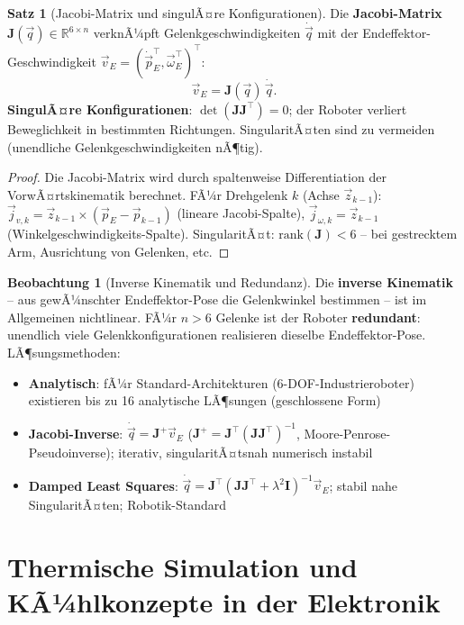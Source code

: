 ﻿\documentclass[a4paper,12pt]{report}
\theoremstyle{definition}
\newtheorem{satz}{Satz}
\newtheorem{beobachtung}{Beobachtung}
\begin{document}
\begin{satz}[Jacobi-Matrix und singulÃ¤re Konfigurationen]
Die \textbf{Jacobi-Matrix} $\mathbf{J}(\vec{q}) \in \mathbb{R}^{6\times n}$
verknÃ¼pft Gelenkgeschwindigkeiten $\dot{\vec{q}}$ mit der
Endeffektor-Geschwindigkeit $\vec{v}_E = (\dot{\vec{p}}_E^\top, \vec{\omega}_E^\top)^\top$:
\[
  \vec{v}_E = \mathbf{J}(\vec{q})\,\dot{\vec{q}}.
\]
\textbf{SingulÃ¤re Konfigurationen}: $\det(\mathbf{J}\mathbf{J}^\top) = 0$;
der Roboter verliert Beweglichkeit in bestimmten Richtungen.
SingularitÃ¤ten sind zu vermeiden (unendliche Gelenkgeschwindigkeiten nÃ¶tig).
\end{satz}
\begin{proof}
Die Jacobi-Matrix wird durch spaltenweise Differentiation der VorwÃ¤rtskinematik berechnet.
FÃ¼r Drehgelenk $k$ (Achse $\vec{z}_{k-1}$):
$\vec{j}_{v,k} = \vec{z}_{k-1}\times(\vec{p}_E - \vec{p}_{k-1})$ (lineare Jacobi-Spalte),
$\vec{j}_{\omega,k} = \vec{z}_{k-1}$ (Winkelgeschwindigkeits-Spalte).
SingularitÃ¤t: $\mathrm{rank}(\mathbf{J}) < 6$ -- bei gestrecktem Arm,
Ausrichtung von Gelenken, etc.
\end{proof}

\begin{beobachtung}[Inverse Kinematik und Redundanz]
Die \textbf{inverse Kinematik} -- aus gewÃ¼nschter Endeffektor-Pose
die Gelenkwinkel bestimmen -- ist im Allgemeinen nichtlinear.
FÃ¼r $n > 6$ Gelenke ist der Roboter \textbf{redundant}:
unendlich viele Gelenkkonfigurationen realisieren dieselbe Endeffektor-Pose.
LÃ¶sungsmethoden:
\begin{itemize}
    \item[-] \textbf{Analytisch}: fÃ¼r Standard-Architekturen (6-DOF-Industrieroboter)
          existieren bis zu 16 analytische LÃ¶sungen (geschlossene Form)
    \item[-] \textbf{Jacobi-Inverse}: $\dot{\vec{q}} = \mathbf{J}^+\vec{v}_E$
          ($\mathbf{J}^+ = \mathbf{J}^\top(\mathbf{J}\mathbf{J}^\top)^{-1}$, Moore-Penrose-Pseudoinverse);
          iterativ, singularitÃ¤tsnah numerisch instabil
    \item[-] \textbf{Damped Least Squares}: $\dot{\vec{q}} = \mathbf{J}^\top(\mathbf{J}\mathbf{J}^\top + \lambda^2\mathbf{I})^{-1}\vec{v}_E$;
          stabil nahe SingularitÃ¤ten; Robotik-Standard
\end{itemize}
\end{beobachtung}

\section{Thermische Simulation und KÃ¼hlkonzepte in der Elektronik}
\end{document}

